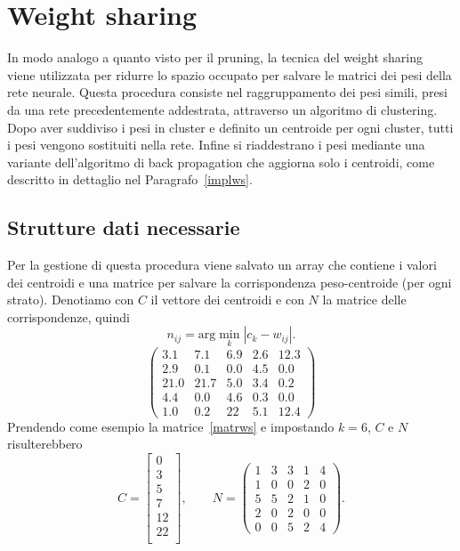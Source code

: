 \documentclass[11pt,a4paper,twoside,
openright]{book}
\begin{document}
\section{Weight sharing}
In modo analogo a quanto visto per il pruning, la tecnica del weight sharing~\cite{han2015compression} viene utilizzata per ridurre lo spazio occupato per salvare le matrici dei pesi della rete neurale. Questa procedura consiste nel raggruppamento dei pesi simili, presi da una rete precedentemente addestrata, attraverso un algoritmo di clustering. Dopo aver suddiviso i pesi in cluster e definito un centroide per ogni cluster, tutti i pesi vengono sostituiti nella rete. Infine si riaddestrano i pesi mediante una variante dell'algoritmo di back propagation che aggiorna solo i centroidi, come descritto in dettaglio nel Paragrafo~\ref{implws}.

\subsection{Strutture dati necessarie}
Per la gestione di questa procedura viene salvato un array che contiene i valori dei centroidi e una matrice per salvare la corrispondenza peso-centroide (per ogni strato).
Denotiamo con $C$ il vettore dei centroidi e con $N$ la matrice delle corrispondenze, quindi
\begin{equation}
n_{ij} = \text{arg}\min\limits_{k}|c_{k}-w_{ij}|.
\label{ws}
\end{equation}
\begin{equation}
\begin{pmatrix} 
3.1 & 7.1 & 6.9 & 2.6 & 12.3\\
2.9 & 0.1 & 0.0 & 4.5 & 0.0\\
21.0 & 21.7 & 5.0 & 3.4 & 0.2\\
4.4 & 0.0 & 4.6 & 0.3 & 0.0\\
1.0 & 0.2 & 22 & 5.1 & 12.4 
\end{pmatrix}
\label{matrws}
\end{equation}
Prendendo come esempio la matrice~\ref{matrws} e impostando $k=6$, $C$ e $N$ risulterebbero
\begin{equation}
C=
\begin{bmatrix} 
	0  \\
	3  \\
	5  \\
	7  \\
	12 \\
	22 \\
\end{bmatrix}, \qquad
N=
\begin{pmatrix} 
1 & 3 & 3 & 1 & 4\\
1 & 0 & 0 & 2 & 0\\
5 & 5 & 2 & 1 & 0\\
2 & 0 & 2 & 0 & 0\\
0 & 0 & 5 & 2 & 4 
\end{pmatrix}.
\label{NC}
\end{equation}
\end{document}
